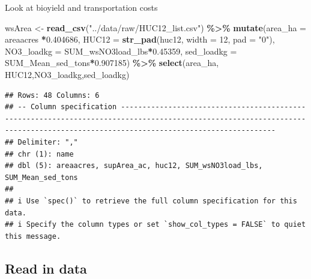 \documentclass[
]{article}
\newenvironment{Shaded}{\begin{snugshade}}{\end{snugshade}}
\newcommand{\AttributeTok}[1]{\textcolor[rgb]{0.13,0.29,0.53}{#1}}
\newcommand{\CommentTok}[1]{\textcolor[rgb]{0.56,0.35,0.01}{\textit{#1}}}
\newcommand{\ConstantTok}[1]{\textcolor[rgb]{0.56,0.35,0.01}{#1}}
\newcommand{\DecValTok}[1]{\textcolor[rgb]{0.00,0.00,0.81}{#1}}
\newcommand{\FloatTok}[1]{\textcolor[rgb]{0.00,0.00,0.81}{#1}}
\newcommand{\FunctionTok}[1]{\textcolor[rgb]{0.13,0.29,0.53}{\textbf{#1}}}
\newcommand{\NormalTok}[1]{#1}
\newcommand{\OtherTok}[1]{\textcolor[rgb]{0.56,0.35,0.01}{#1}}
\newcommand{\SpecialCharTok}[1]{\textcolor[rgb]{0.81,0.36,0.00}{\textbf{#1}}}
\newcommand{\StringTok}[1]{\textcolor[rgb]{0.31,0.60,0.02}{#1}}
\begin{document}
Look at bioyield and transportation costs

\begin{Shaded}
\begin{Highlighting}[]
\NormalTok{wsArea }\OtherTok{\textless{}{-}} \FunctionTok{read\_csv}\NormalTok{(}\StringTok{"../data/raw/HUC12\_list.csv"}\NormalTok{) }\SpecialCharTok{\%\textgreater{}\%}
  \FunctionTok{mutate}\NormalTok{(}\AttributeTok{area\_ha =}\NormalTok{ areaacres }\SpecialCharTok{*}\FloatTok{0.404686}\NormalTok{,}
         \AttributeTok{HUC12 =} \FunctionTok{str\_pad}\NormalTok{(huc12, }\AttributeTok{width =} \DecValTok{12}\NormalTok{, }\AttributeTok{pad =} \StringTok{"0"}\NormalTok{),}
         \AttributeTok{NO3\_loadkg =}\NormalTok{ SUM\_wsNO3load\_lbs}\SpecialCharTok{*}\FloatTok{0.45359}\NormalTok{,}
         \AttributeTok{sed\_loadkg =}\NormalTok{ SUM\_Mean\_sed\_tons}\SpecialCharTok{*}\FloatTok{0.907185}\NormalTok{) }\SpecialCharTok{\%\textgreater{}\%}
  \FunctionTok{select}\NormalTok{(area\_ha, HUC12,NO3\_loadkg,sed\_loadkg)}
\end{Highlighting}
\end{Shaded}

\begin{verbatim}
## Rows: 48 Columns: 6
## -- Column specification --------------------------------------------------------------------------------------------------------------------------------------------------------------------------------
## Delimiter: ","
## chr (1): name
## dbl (5): areaacres, supArea_ac, huc12, SUM_wsNO3load_lbs, SUM_Mean_sed_tons
## 
## i Use `spec()` to retrieve the full column specification for this data.
## i Specify the column types or set `show_col_types = FALSE` to quiet this message.
\end{verbatim}

\subsection{Read in data}\label{read-in-data}

\begin{Shaded}
\end{Shaded}
\end{document}
